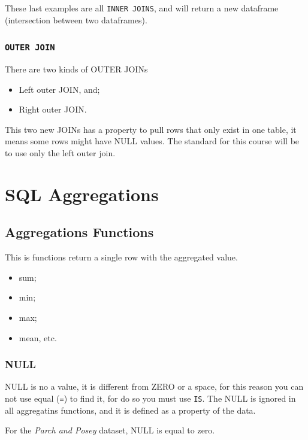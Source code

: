 \documentclass[]{book}
\providecommand{\tightlist}{%
  \setlength{\itemsep}{0pt}\setlength{\parskip}{0pt}}
\begin{document}
These last examples are all \texttt{INNER\ JOINS}, and will return a new
dataframe (intersection between two dataframes).

\subsubsection{\texorpdfstring{\texttt{OUTER\ JOIN}}{OUTER JOIN}}\label{outer-join}

There are two kinds of OUTER JOINs

\begin{itemize}
\tightlist
\item
  Left outer JOIN, and;
\item
  Right outer JOIN.
\end{itemize}

This two new JOINs has a property to pull rows that only exist in one
table, it means some rows might have NULL values. The standard for this
course will be to use only the left outer join.

\section{SQL Aggregations}\label{sql-aggregations}

\subsection{Aggregations Functions}\label{aggregations-functions}

This is functions return a single row with the aggregated value.

\begin{itemize}
\tightlist
\item
  sum;
\item
  min;
\item
  max;
\item
  mean, etc.
\end{itemize}

\subsubsection{NULL}\label{null}

NULL is no a value, it is different from ZERO or a space, for this
reason you can not use equal (\texttt{=}) to find it, for do so you must
use \texttt{IS}. The NULL is ignored in all aggregatins functions, and
it is defined as a property of the data.

For the \emph{Parch and Posey} dataset, NULL is equal to zero.
\end{document}
